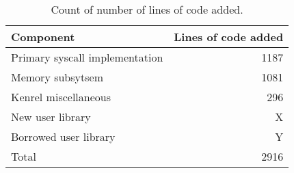 
\begin{table}[t]
\begin{tabularx}{233pt}{l | r}
Component & Lines of code added \\
\hline
Primary syscall implementation & 1187 \\
Memory subsytsem & 1081 \\
Kenrel miscellaneous & 296 \\
New user library & X \\
Borrowed user library & Y \\
\hline
Total & 2916
\end{tabularx}
\caption{Count of number of lines of code added.}
\label{tab:loc}
\end{table}

\endinput

